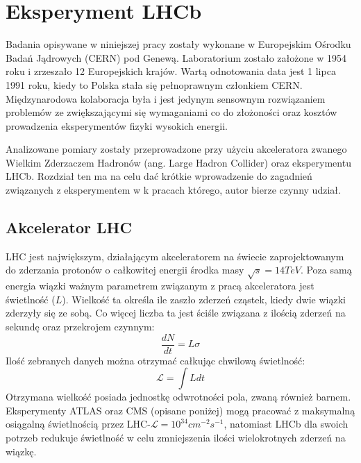 \chapter{Eksperyment LHCb}

Badania opisywane w niniejszej pracy zostały wykonane w Europejskim Ośrodku Badań Jądrowych (CERN) pod Genewą. Laboratorium zostało założone w 1954 roku i zrzeszało 12 Europejskich krajów. Wartą odnotowania data jest 1 lipca  1991 roku, kiedy to Polska stała się pełnoprawnym członkiem CERN. Międzynarodowa kolaboracja była i jest jedynym sensownym rozwiązaniem problemów ze zwiększającymi się wymaganiami co do złożoności oraz kosztów prowadzenia eksperymentów fizyki wysokich energii.

Analizowane pomiary zostały przeprowadzone przy użyciu akceleratora zwanego Wielkim Zderzaczem Hadronów (ang. Large Hadron Collider) oraz eksperymentu LHCb. Rozdział ten ma na celu dać krótkie wprowadzenie do zagadnień związanych z eksperymentem w k  pracach którego, autor bierze czynny udział. 

\section{Akcelerator LHC}
\indent LHC jest największym, działającym akceleratorem na świecie zaprojektowanym do zderzania protonów o całkowitej energii środka masy $\sqrt{s}=14 TeV$. Poza samą energia wiązki ważnym parametrem związanym z pracą akceleratora jest  świetlność ($L$). Wielkość ta określa ile zaszło zderzeń cząstek, kiedy dwie wiązki zderzyły się ze sobą. Co więcej liczba ta jest ściśle związana z ilością zderzeń na sekundę oraz przekrojem czynnym:
\begin{equation}
\frac{dN}{dt} =L \sigma
\end{equation}
Ilość zebranych danych można otrzymać całkując chwilową świetlność:
\begin{equation}
\mathcal{L} = \int L dt
\end{equation}
Otrzymana wielkość posiada jednostkę odwrotności pola, zwaną również barnem. Eksperymenty ATLAS oraz CMS (opisane poniżej) mogą pracować z maksymalną osiągalną świetlnością przez LHC-$\mathcal{L}=10^{34}cm^{-2}s^{-1}$, natomiast LHCb dla swoich potrzeb redukuje świetlność w celu zmniejszenia ilości wielokrotnych zderzeń na wiązkę. 

